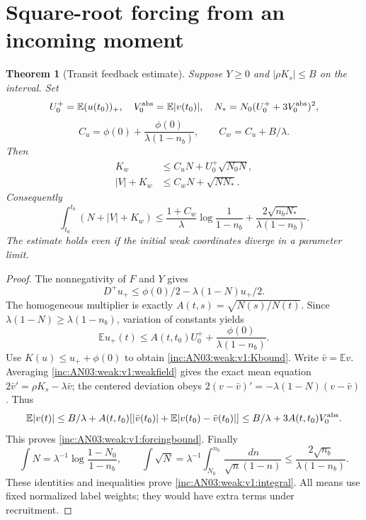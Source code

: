 \documentclass[11pt]{article}
\numberwithin{equation}{section}
\newtheorem{theorem}{Theorem}[section]\newtheorem{lemma}[theorem]{Lemma}\newtheorem{proposition}[theorem]{Proposition}\newtheorem{corollary}[theorem]{Corollary}
\theoremstyle{remark}\newtheorem{remark}[theorem]{Remark}
\newcommand{\dd}{\,d}\newcommand{\E}{\mathbb E}\newcommand{\R}{\mathbb R}
\begin{document}
\section{Square-root forcing from an incoming moment}
\begin{theorem}[Transit feedback estimate]\label{inc:AN03:weak:v1:forcing}
Suppose $Y\ge0$ and $|\rho K_s|\le B$ on the interval. Set
\[
 U_0^+=\E(u(t_0))_+,\quad V_0^{\rm abs}=\E|v(t_0)|,\quad
 N_*=N_0(U_0^++3V_0^{\rm abs})^2,
\]
\[
 C_u=\phi(0)+\frac{\phi(0)}{\lambda(1-n_b)},\qquad
 C_w=C_u+B/\lambda.
\]
Then
\begin{align}
 K_w&\le C_uN+U_0^+\sqrt{N_0N},\label{inc:AN03:weak:v1:Kbound}\\
 |V|+K_w&\le C_wN+\sqrt{NN_*}.\label{inc:AN03:weak:v1:forcingbound}
\end{align}
Consequently
\begin{equation}\label{inc:AN03:weak:v1:integral}
 \int_{t_0}^{t_b}(N+|V|+K_w)
 \le\frac{1+C_w}{\lambda}\log\frac1{1-n_b}
       +\frac{2\sqrt{n_bN_*}}{\lambda(1-n_b)}.
\end{equation}
The estimate holds even if the initial weak coordinates diverge in a parameter limit.
\end{theorem}
\begin{proof}
The nonnegativity of $F$ and $Y$ gives
\[
 D^+u_+\le\phi(0)/2-\lambda(1-N)u_+/2.
\]
The homogeneous multiplier is exactly $A(t,s)=\sqrt{N(s)/N(t)}$. Since $\lambda(1-N)\ge\lambda(1-n_b)$, variation of constants yields
\[
 \E u_+(t)\le A(t,t_0)U_0^++\frac{\phi(0)}{\lambda(1-n_b)}.
\]
Use $K(u)\le u_++\phi(0)$ to obtain \eqref{inc:AN03:weak:v1:Kbound}.
Write $\bar v=\E v$. Averaging \eqref{inc:AN03:weak:v1:weakfield} gives the exact mean equation $2\bar v'=\rho K_s-\lambda\bar v$; the centered deviation obeys $2(v-\bar v)'=-\lambda(1-N)(v-\bar v)$. Thus
\[
 \E|v(t)|\le B/\lambda+A(t,t_0)[|\bar v(t_0)|+\E|v(t_0)-\bar v(t_0)|]
 \le B/\lambda+3A(t,t_0)V_0^{\rm abs}.
\]
This proves \eqref{inc:AN03:weak:v1:forcingbound}. Finally
\[
 \int N=\lambda^{-1}\log\frac{1-N_0}{1-n_b},\qquad
 \int\sqrt N=\lambda^{-1}\int_{N_0}^{n_b}\frac{\dd n}{\sqrt n(1-n)}
 \le\frac{2\sqrt{n_b}}{\lambda(1-n_b)}.
\]
These identities and inequalities prove \eqref{inc:AN03:weak:v1:integral}. All means use fixed normalized label weights; they would have extra terms under recruitment.
\end{proof}
\end{document}
